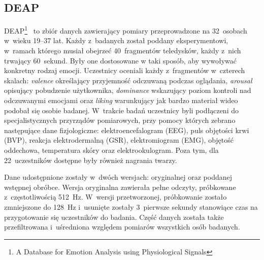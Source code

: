\subsection{DEAP}
DEAP\footnote{A Database for Emotion Analysis using Physiological Signals}~\cite{deap_dataset_2011} to zbiór danych zawierający pomiary przeprowadzone na 32~osobach w~wieku 19--37 lat. Każdy z~badanych został poddany eksperymentowi, w~ramach którego musiał obejrzeć 40~fragmentów teledysków, każdy z~nich trwający 60~sekund. Były one dostosowane w taki sposób, aby wywoływać konkretny rodzaj emocji. Uczestnicy oceniali każdy z~fragmentów w~czterech skalach: \textit{valence} określający przyjemność odczuwaną podczas oglądania, \textit{arousal} opisujący pobudzenie użytkownika, \textit{dominance} wskazujący poziom kontroli nad odczuwanymi emocjami oraz \textit{liking} warunkujący jak bardzo materiał wideo podobał się osobie badanej. W~trakcie badań uczestnicy byli podłączeni do specjalistycznych przyrządów pomiarowych, przy pomocy których zebrano następujące dane fizjologiczne: elektroencefalogram (EEG), puls objętości krwi (BVP), reakcja elektrodermalną (GSR), elektromiogram (EMG), objętość oddechowa, temperatura skóry oraz elektrookulogram. Poza tym, dla 22~uczestników dostępne były również nagrania twarzy. 

Dane udostępnione zostały w~dwóch wersjach: oryginalnej oraz poddanej wstępnej obróbce. Wersja oryginalna zawierała pełne odczyty, próbkowane z~częstotliwością 512~Hz. W~wersji przetworzonej, próbkowanie zostało zmniejszone do 128~Hz i~usunięte zostały 3~pierwsze sekundy stanowiące czas na przygotowanie się uczestników do badania. Część danych została także przefiltrowana i~uśredniona względem pomiarów wszystkich osób badanych.

